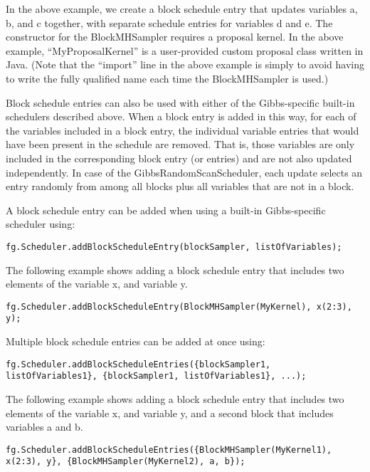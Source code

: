 In the above example, we create a block schedule entry that updates variables a, b, and c together, with separate schedule entries for variables d and e.  The constructor for the BlockMHSampler requires a proposal kernel.  In the above example, ``MyProposalKernel'' is a user-provided custom proposal class \ifmatlab written in Java\fi.  \ifmatlab (Note that the ``import'' line in the above example is simply to avoid having to write the fully qualified name each time the BlockMHSampler is used.) \fi

Block schedule entries can also be used with either of the Gibbs-specific built-in schedulers described above.  When a block entry is added in this way, for each of the variables included in a block entry, the individual variable entries that would have been present in the schedule are removed.  That is, those variables are only included in the corresponding block entry (or entries) and are not also updated independently.  In case of the GibbsRandomScanScheduler, each update selects an entry randomly from among all blocks plus all variables that are not in a block.

\ifmatlab
A block schedule entry can be added when using a built-in Gibbs-specific scheduler using:
\begin{lstlisting}
fg.Scheduler.addBlockScheduleEntry(blockSampler, listOfVariables);
\end{lstlisting}

The following example shows adding a block schedule entry that includes two elements of the variable x, and variable y.

\begin{lstlisting}
fg.Scheduler.addBlockScheduleEntry(BlockMHSampler(MyKernel), x(2:3), y);
\end{lstlisting}


Multiple block schedule entries can be added at once using:
\begin{lstlisting}
fg.Scheduler.addBlockScheduleEntries({blockSampler1, listOfVariables1}, {blockSampler1, listOfVariables1}, ...);
\end{lstlisting}

The following example shows adding a block schedule entry that includes two elements of the variable x, and variable y, and a second block that includes variables a and b.

\begin{lstlisting}
fg.Scheduler.addBlockScheduleEntries({BlockMHSampler(MyKernel1), x(2:3), y}, {BlockMHSampler(MyKernel2), a, b});
\end{lstlisting}

